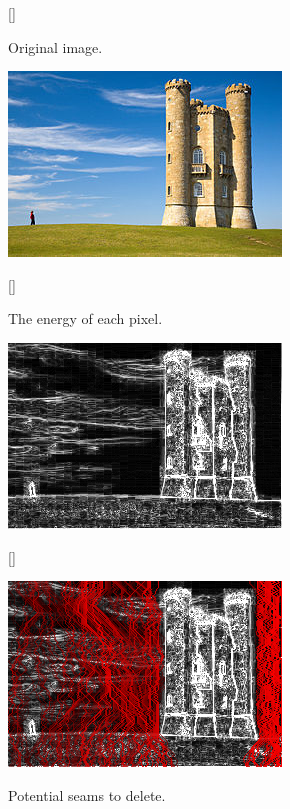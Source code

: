 \begin{figure}[htp]
    \begin{subfloatrow}
        [\FBwidth]
        {\caption{Original image.}}
        {\includegraphics[scale=.7]{figures/seamCarving1.png}}
    \end{subfloatrow}
    \begin{subfloatrow}
        [\FBwidth]
        {\caption{The energy of each pixel.}\label{fig:scEnergy}}
        {\includegraphics[scale=.7]{figures/seamCarving2.png}}
    \end{subfloatrow}
    \begin{subfloatrow}
        [\FBwidth]
        {\caption{Potential seams to delete.}\label{fig:scSeams}}
        {\includegraphics[scale=.7]{figures/seamCarving3.png}}
    \end{subfloatrow}

\end{figure}
